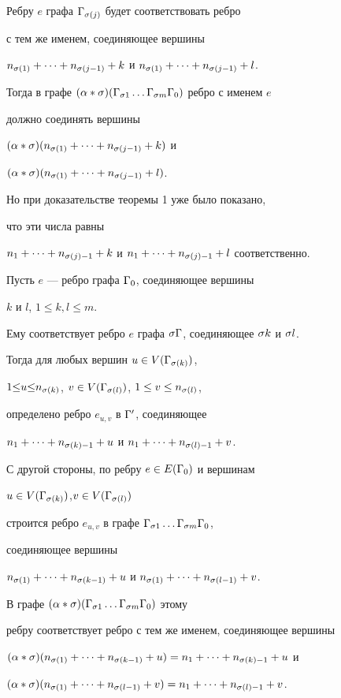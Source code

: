 \begin{pf}
Ребру $e$ графа ${\Gamma}_{\sigma (j)}$ будет соответствовать ребро 


с тем же именем, соединяющее вершины 


$n_{\sigma (1)}+\dotsb +n_{\sigma (j-1)}+k$ и $n_{\sigma (1)}+\dotsb +n_{\sigma (j-1)}+l$.


Тогда в графе $(\alpha * \sigma)({\Gamma}_{\sigma 1}\dotsc {\Gamma}_{\sigma m}{\Gamma}_0)$ ребро с именем $e$


должно соединять вершины


$(\alpha * \sigma)(n_{\sigma (1)}+\dotsb +n_{\sigma (j-1)}+k)$ и


$(\alpha * \sigma)(n_{\sigma (1)}+\dotsb +n_{\sigma (j-1)}+l)$.


Но при доказательстве теоремы 1 уже было показано, 


что эти числа равны  


$n_1+\dotsb +n_{\sigma (j)-1}+k$ и $n_1+\dotsb +n_{\sigma (j)-1}+l$ соответственно.





Пусть $e$ --- ребро графа ${\Gamma}_0$, соединяющее вершины 


$k$ и $l$, $1\leq k,l\leq m$.


Ему соответствует ребро $e$ графа $\sigma{\Gamma}$, соединяющее $\sigma k$ и $\sigma l$.


Тогда для любых вершин $u\in V({\Gamma}_{\sigma (k)})$,


$1{\leq} u{\leq} n_{\sigma (k)}$, $v\in V({\Gamma}_{\sigma (l)})$, $1\leq v\leq n_{\sigma (l)}$, 


определено ребро $e_{u,v}$ в ${\Gamma}'$, соединяющее 


$n_1+\dotsb +n_{\sigma (k)-1}+u$ и $n_1+\dotsb +n_{\sigma (l)-1}+v$.  


С другой стороны, по ребру $e\in E({\Gamma}_0)$ и вершинам 


$u\in V({\Gamma}_{\sigma (k)})$,\linebreak $v\in V({\Gamma}_{\sigma (l)})$


строится ребро $e_{u,v}$ в графе ${\Gamma}_{\sigma 1}\dotsc {\Gamma}_{\sigma m}{\Gamma}_0$, 


соединяющее вершины  


$n_{\sigma (1)}+\dotsb +n_{\sigma (k-1)}+u$ и $n_{\sigma (1)}+\dotsb +n_{\sigma (l-1)}+v$.  


В графе $(\alpha * \sigma)({\Gamma}_{\sigma 1}\dotsc {\Gamma}_{\sigma m}{\Gamma}_0)$ этому 


ребру соответствует ребро с тем же именем, соединяющее вершины 


$(\alpha * \sigma)(n_{\sigma (1)}+\dotsb +n_{\sigma (k-1)}+u)=n_1+\dotsb +n_{\sigma (k)-1}+u$ и


$(\alpha * \sigma)(n_{\sigma (1)}+\dotsb +n_{\sigma (l-1)}+v)=n_1+\dotsb +n_{\sigma (l)-1}+v$.






\end{pf}
